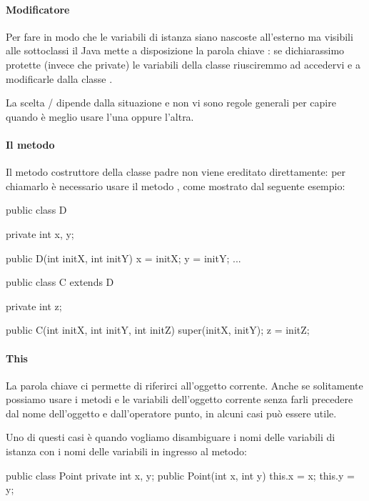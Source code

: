 \paragraph{Modificatore } Per fare in modo che le variabili di istanza siano nascoste all'esterno ma visibili alle sottoclassi il Java mette a disposizione la parola chiave : se dichiarassimo protette (invece che private) le variabili della classe  riusciremmo ad accedervi e a modificarle dalla classe .

La scelta / dipende dalla situazione e non vi sono regole generali per capire quando è meglio usare l'una oppure l'altra.

\paragraph{Il metodo } Il metodo costruttore della classe padre non viene ereditato direttamente: per chiamarlo è necessario usare il metodo , come mostrato dal seguente esempio:
\begin{Java}
    public class D {
        private int x, y;
        
        public D(int initX, int initY){
            x = initX;
            y = initY;
        }
        ...
    }

    public class C extends D {
        private int z;

        public C(int initX, int initY, int initZ){
            super(initX, initY);
            z = initZ;
        }
    }
\end{Java}

\paragraph{This} La parola chiave  ci permette di riferirci all'oggetto corrente. Anche se solitamente possiamo usare i metodi e le variabili dell'oggetto corrente senza farli precedere dal nome dell'oggetto e dall'operatore punto, in alcuni casi può essere utile.

Uno di questi casi è quando vogliamo disambiguare i nomi delle variabili di istanza con i nomi delle variabili in ingresso al metodo:
\begin{Java}
    public class Point {
        private int x, y;
        public Point(int x, int y){
            this.x = x;
            this.y = y;
        }
    }
\end{Java}

